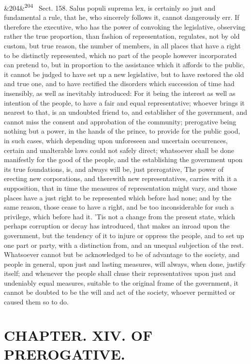 \documentclass[12pt]{article}
\newcommand{\para}[1][]{\par\noindent\ifx&#1&\else\textsuperscript{\footnotesize #1}~\fi}
\begin{document}
\para[204] Sect. 158. Salus populi suprema lex, is certainly so just and fundamental a rule, that he, who sincerely follows it, cannot dangerously err. If therefore the executive, who has the power of convoking the legislative, observing rather the true proportion, than fashion of representation, regulates, not by old custom, but true reason, the number of members, in all places that have a right to be distinctly represented, which no part of the people however incorporated can pretend to, but in proportion to the assistance which it affords to the public, it cannot be judged to have set up a new legislative, but to have restored the old and true one, and to have rectified the disorders which succession of time had insensibly, as well as inevitably introduced: For it being the interest as well as intention of the people, to have a fair and equal representative; whoever brings it nearest to that, is an undoubted friend to, and establisher of the government, and cannot miss the consent and approbation of the community; prerogative being nothing but a power, in the hands of the prince, to provide for the public good, in such cases, which depending upon unforeseen and uncertain occurrences, certain and unalterable laws could not safely direct; whatsoever shall be done manifestly for the good of the people, and the establishing the government upon its true foundations, is, and always will be, just prerogative, The power of erecting new corporations, and therewith new representatives, carries with it a supposition, that in time the measures of representation might vary, and those places have a just right to be represented which before had none; and by the same reason, those cease to have a right, and be too inconsiderable for such a privilege, which before had it. 'Tis not a change from the present state, which perhaps corruption or decay has introduced, that makes an inroad upon the government, but the tendency of it to injure or oppress the people, and to set up one part or party, with a distinction from, and an unequal subjection of the rest. Whatsoever cannot but be acknowledged to be of advantage to the society, and people in general, upon just and lasting measures, will always, when done, justify itself; and whenever the people shall chuse their representatives upon just and undeniably equal measures, suitable to the original frame of the government, it cannot be doubted to be the will and act of the society, whoever permitted or caused them so to do.

\section*{CHAPTER. XIV. OF PREROGATIVE.}
\end{document}
